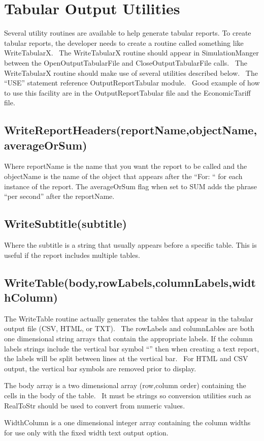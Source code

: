 \section{Tabular Output Utilities}\label{tabular-output-utilities}

Several utility routines are available to help generate tabular reports. To create tabular reports, the developer needs to create a routine called something like WriteTabularX.~ The WriteTabularX routine should appear in SimulationManger between the OpenOutputTabularFile and CloseOutputTabularFile calls.~ The WriteTabularX routine should make use of several utilities described below.~ The ``USE'' statement reference OutputReportTabular module.~ Good example of how to use this facility are in the OutputReportTabular file and the EconomicTariff file.

\subsection{WriteReportHeaders(reportName,objectName,averageOrSum)}\label{writereportheadersreportnameobjectnameaverageorsum}

Where reportName is the name that you want the report to be called and the objectName is the name of the object that appears after the ``For: `` for each instance of the report. The averageOrSum flag when set to SUM adds the phrase ``per second'' after the reportName.

\subsection{WriteSubtitle(subtitle)}\label{writesubtitlesubtitle}

Where the subtitle is a string that usually appears before a specific table. This is useful if the report includes multiple tables.

\subsection{WriteTable(body,rowLabels,columnLabels,widthColumn)}\label{writetablebodyrowlabelscolumnlabelswidthcolumn}

The WriteTable routine actually generates the tables that appear in the tabular output file (CSV, HTML, or TXT).~ The rowLabels and columnLables are both one dimensional string arrays that contain the appropriate labels. If the column labels strings include the vertical bar symbol ``\textbar{}'' then when creating a text report, the labels will be split between lines at the vertical bar.~ For HTML and CSV output, the vertical bar symbols are removed prior to display.

The body array is a two dimensional array (row,column order) containing the cells in the body of the table.~ It must be strings so conversion utilities such as RealToStr should be used to convert from numeric values.

WidthColumn is a one dimensional integer array containing the column widths for use only with the fixed width text output option.
